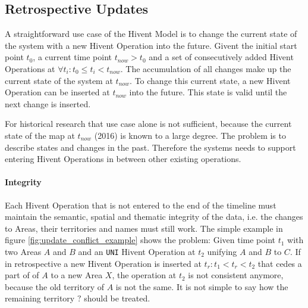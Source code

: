 

\subsection{Retrospective Updates} %
\label{sub:retrospective_updates}

A straightforward use case of the Hivent Model is to change the current state of the system with a new Hivent Operation into the future. Givent the initial start point $t_0$, a current time point $t_{now} > t_0$ and a set of consecutively added Hivent Operations at $\forall t_i: t_0 \leq t_i < t_{now}$. The accumulation of all changes make up the current state of the system at $t_{now}$. To change this current state, a new Hivent Operation can be inserted at $t_{now}$ into the future. This state is valid until the next change is inserted.

For historical research that use case alone is not sufficient, because the current state of the map at $t_{now}$ (2016) is known to a large degree. The problem is to describe states and changes in the past. Therefore the systems needs to support entering Hivent Operations in between other existing operations.


\paragraph{Integrity} %
\label{par:integrity}

Each Hivent Operation that is not entered to the end of the timeline must maintain the semantic, spatial and thematic integrity of the data, i.e. the changes to Areas, their territories and names must still work. The simple example in figure \ref{fig:update_conflict_example} shows the problem: Given time point $t_1$ with two Areas $A$ and $B$ and an \texttt{UNI} Hivent Operation at $t_2$ unifying $A$ and $B$ to $C$. If in retrospective a new Hivent Operation is inserted at $t_r: t_1 < t_r < t_2$ that cedes a part of of $A$ to a new Area $X$, the operation at $t_2$ is not consistent anymore, because the old territory of $A$ is not the same. It is not simple to say how the remaining territory $?$ should be treated.


